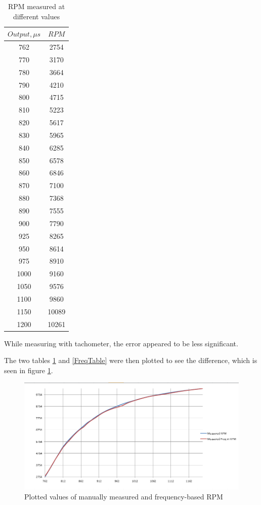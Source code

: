 \begin{table}[H]
\centering
\begin{tabular}{|c|c|}
\hline
$Output,\mu s$ 	& $RPM$ \\ \hline
762 			& 2754	\\ \hline
770				& 3170	\\ \hline
780				& 3664	\\ \hline
790				& 4210	\\ \hline
800 			& 4715  \\ \hline
810 			& 5223	\\ \hline
820 			& 5617  \\ \hline
830				& 5965 	\\ \hline
840				& 6285	\\ \hline
850 			& 6578	\\ \hline
860 			& 6846	\\ \hline
870 			& 7100	\\ \hline
880 			& 7368	\\ \hline
890 			& 7555	\\ \hline
900 			& 7790	\\ \hline
925 			& 8265	\\ \hline
950 			& 8614	\\ \hline
975 			& 8910	\\ \hline
1000 			& 9160	\\ \hline
1050 			& 9576	\\ \hline
1100 			& 9860	\\ \hline
1150 			& 10089	\\ \hline
1200			& 10261	\\ \hline
\end{tabular}
\caption{RPM measured at different values}
\label{RPMTable}
\end{table}

While measuring with tachometer, the error appeared to be less significant.

The two tables \ref{RPMTable} and \ref{FreqTable} were then plotted to see the difference, which is seen in figure \ref{RPMvsFreq}.

\begin{figure}[H]
  \centering
    \includegraphics[width=1\textwidth]{images/RPMvsFreq.png}
	\caption{Plotted values of manually measured and frequency-based RPM}
	\label{RPMvsFreq}
\end{figure}

